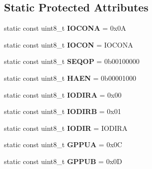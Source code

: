 \subsection*{Static Protected Attributes}
\begin{DoxyCompactItemize}
\item 
\hypertarget{classMCP23S17_abbe37643146bb9195797ffda7f43d66f}{static const uint8\-\_\-t {\bfseries I\-O\-C\-O\-N\-A} = 0x0\-A}\label{classMCP23S17_abbe37643146bb9195797ffda7f43d66f}

\item 
\hypertarget{classMCP23S17_a63859159568a5837034bb88b20c53e2d}{static const uint8\-\_\-t {\bfseries I\-O\-C\-O\-N} = I\-O\-C\-O\-N\-A}\label{classMCP23S17_a63859159568a5837034bb88b20c53e2d}

\item 
\hypertarget{classMCP23S17_a19eebedb9b1a7c2a572245b78b93d8dc}{static const uint8\-\_\-t {\bfseries S\-E\-Q\-O\-P} = 0b00100000}\label{classMCP23S17_a19eebedb9b1a7c2a572245b78b93d8dc}

\item 
\hypertarget{classMCP23S17_a599afe026032676b92035a8988750c60}{static const uint8\-\_\-t {\bfseries H\-A\-E\-N} = 0b00001000}\label{classMCP23S17_a599afe026032676b92035a8988750c60}

\item 
\hypertarget{classMCP23S17_a1c8011f21ae71b1bb9c0f2da7b3bb1be}{static const uint8\-\_\-t {\bfseries I\-O\-D\-I\-R\-A} = 0x00}\label{classMCP23S17_a1c8011f21ae71b1bb9c0f2da7b3bb1be}

\item 
\hypertarget{classMCP23S17_a54be44f7e7d58f8cd4c2876e92b1bc39}{static const uint8\-\_\-t {\bfseries I\-O\-D\-I\-R\-B} = 0x01}\label{classMCP23S17_a54be44f7e7d58f8cd4c2876e92b1bc39}

\item 
\hypertarget{classMCP23S17_af9d4a7f36be2498e9fa443af2341d2d7}{static const uint8\-\_\-t {\bfseries I\-O\-D\-I\-R} = I\-O\-D\-I\-R\-A}\label{classMCP23S17_af9d4a7f36be2498e9fa443af2341d2d7}

\item 
\hypertarget{classMCP23S17_a1eefc3383b32c26f17dfe9709b3f8e7c}{static const uint8\-\_\-t {\bfseries G\-P\-P\-U\-A} = 0x0\-C}\label{classMCP23S17_a1eefc3383b32c26f17dfe9709b3f8e7c}

\item 
\hypertarget{classMCP23S17_aa627e5b8b5fb31f810446b7383683a49}{static const uint8\-\_\-t {\bfseries G\-P\-P\-U\-B} = 0x0\-D}\label{classMCP23S17_aa627e5b8b5fb31f810446b7383683a49}


\end{DoxyCompactItemize}
